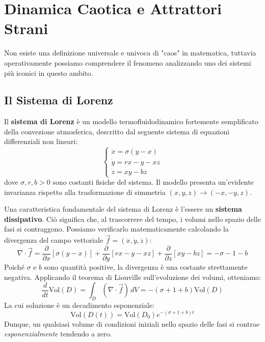 \documentclass[openany]{book}
\theoremstyle{definition}
\theoremstyle{remark}
\begin{document}
 
\section{Dinamica Caotica e Attrattori Strani}

Non esiste una definizione universale e univoca di "caos" in matematica, tuttavia operativamente possiamo comprendere il fenomeno analizzando uno dei sistemi più iconici in questo ambito.

\subsection*{Il Sistema di Lorenz}
Il \textbf{sistema di Lorenz} è un modello termofluidodinamico fortemente semplificato della convezione atmosferica, descritto dal seguente sistema di equazioni differenziali non lineari:
\begin{equation}
    \begin{cases}
        \dot{x} = \sigma(y - x) \\
        \dot{y} = rx - y - xz \\
        \dot{z} = xy - bz
    \end{cases}
\end{equation}
dove $\sigma, r, b > 0$ sono costanti fisiche del sistema. Il modello presenta un'evidente invarianza rispetto alla trasformazione di simmetria $(x, y, z) \to (-x, -y, z)$.

Una caratteristica fondamentale del sistema di Lorenz è l'essere un \textbf{sistema dissipativo}. Ciò significa che, al trascorrere del tempo, i volumi nello spazio delle fasi si contraggono. Possiamo verificarlo matematicamente calcolando la divergenza del campo vettoriale $\vec{f} = (\dot{x}, \dot{y}, \dot{z})$:
\begin{equation}
    \nabla \cdot \vec{f} = \frac{\partial}{\partial x}[\sigma(y-x)] + \frac{\partial}{\partial y}[rx-y-xz] + \frac{\partial}{\partial z}[xy-bz] = -\sigma - 1 - b
\end{equation}
Poiché $\sigma$ e $b$ sono quantità positive, la divergenza è una costante strettamente negativa. 
Applicando il teorema di Liouville sull'evoluzione dei volumi, otteniamo:
\begin{equation}
    \frac{d}{dt} \text{Vol}(D) = \int_D (\nabla \cdot \vec{f}) \, dV = -(\sigma + 1 + b) \text{Vol}(D) 
\end{equation}
La cui soluzione è un decadimento esponenziale:
\begin{equation}
    \text{Vol}(D(t)) = \text{Vol}(D_0) e^{-(\sigma+1+b)t}
\end{equation}
Dunque, un qualsiasi volume di condizioni iniziali nello spazio delle fasi si contrae \textit{esponenzialmente} tendendo a zero.
\end{document}

